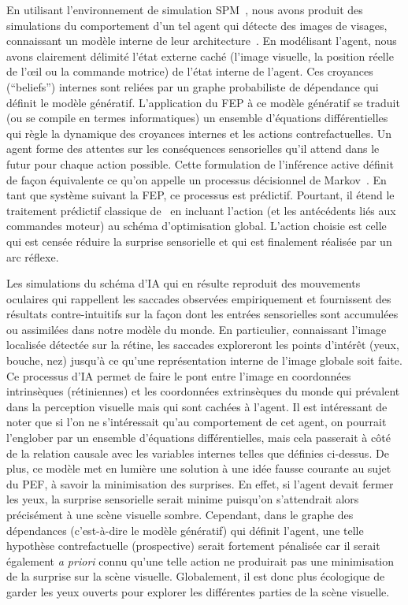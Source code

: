 \documentclass[11pt,french,a4paper,oneside]{article}%
\begin{document}
En utilisant l'environnement de simulation SPM~\citep{SPM12}, nous avons produit des simulations du comportement d'un tel agent qui détecte
des images de visages, connaissant un modèle interne de leur architecture~\citep{Friston12}. En modélisant l'agent, nous avons clairement  délimité l'état externe caché (l'image visuelle, la position réelle de l'œil ou la
commande motrice) de l'état interne de l'agent. Ces croyances (``beliefs'') internes
sont reliées par un graphe probabiliste de dépendance qui définit le
modèle génératif. L'application du FEP à ce modèle génératif se traduit
(ou se compile en termes informatiques) un ensemble d'équations
différentielles qui règle la dynamique des croyances internes
et les actions contrefactuelles. Un agent forme des attentes sur les
conséquences sensorielles qu'il attend dans le futur pour chaque action
possible. Cette formulation de l'inférence active définit de façon équivalente ce qu'on appelle
un processus décisionnel de Markov~\citep{Mirza18}. En tant que système
suivant la FEP, ce processus est prédictif. Pourtant, il étend le
traitement prédictif classique de~\citet{Rao99}
en incluant l'action (et les antécédents liés aux commandes moteur) au
schéma d'optimisation global. L'action choisie est celle qui est censée
réduire la surprise sensorielle et qui est finalement réalisée par un
arc réflexe.

Les simulations du schéma d'IA qui en résulte reproduit des
mouvements oculaires qui rappellent les saccades observées
empiriquement et fournissent des résultats contre-intuitifs sur la
façon dont les entrées sensorielles sont accumulées ou assimilées dans
notre modèle du monde. En particulier, connaissant l'image localisée
détectée sur la rétine, les saccades exploreront les points d'intérêt
(yeux, bouche, nez) jusqu'à ce qu'une représentation interne de l'image
globale soit faite. Ce processus d'IA permet de faire le pont entre
l'image en coordonnées intrinsèques (rétiniennes) et les coordonnées
extrinsèques du monde qui prévalent dans la perception visuelle mais qui
sont cachées à l'agent. Il est intéressant de noter que si l'on ne
s'intéressait qu'au comportement de cet agent, on pourrait l'englober
par un ensemble d'équations différentielles, mais cela passerait à côté
de la relation causale avec les variables internes telles que définies
ci-dessus. De plus, ce modèle met en lumière une solution à une idée
fausse courante au sujet du PEF, à savoir la minimisation des
surprises. En effet, si l'agent devait fermer les yeux, la surprise
sensorielle serait minime puisqu'on s'attendrait alors précisément à une
scène visuelle sombre. Cependant, dans le graphe des dépendances
(c'est-à-dire le modèle génératif) qui définit l'agent, une telle
hypothèse contrefactuelle (prospective) serait fortement pénalisée car
il serait également \emph{a priori} connu qu'une telle action ne produirait pas
une minimisation de la surprise sur la scène visuelle. Globalement, il
est donc plus écologique de garder les yeux ouverts pour explorer les
différentes parties de la scène visuelle.
\end{document}
